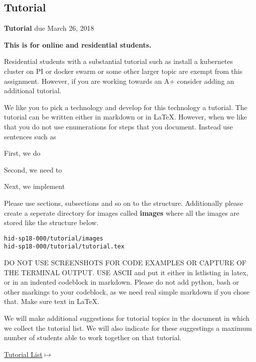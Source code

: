 \subsection{Tutorial}
\label{E:616-tutorial}

\begin{exercise} {\bf Tutorial} due March 26, 2018

{\bf This is for online and residential students.}

Residential students with a substantial tutorial such as install a
kubernetes cluster on PI or docker swarm or some other larger topic
are exempt from this assignment. However, if you are working towards
an A+ consider adding an additional tutorial.

 
We like you to pick a technology and develop for this technology a
tutorial. The tutorial can be written either in markdown or in
LaTeX. However, when we like that you do not use enumerations for
steps that you document. Instead use sentences such as
 
First, we do 
 
Second, we need to
 
Next, we implement
 
Please use sections, subsections and so on to the
structure. Additionally please create a seperate directory for images
called {\bf images} where all the images are stored like the structure
below. 

\begin{lstlisting}
hid-sp18-000/tutorial/images
hid-sp18-000/tutorial/tutorial.tex
\end{lstlisting}
 
DO NOT USE SCREENSHOTS FOR CODE EXAMPLES OR CAPTURE OF THE TERMINAL
OUTPUT.  USE ASCII and put it either in lstlisting in latex, or in an
indented codeblock in markdown. Please do not add python, bash or
other markings to your codeblock, as we need real simple markdown if
you chose that. Make sure text in LaTeX.

 
We will make additional suggestions for tutorial topics in the
document in which we collect the tutorial list. We will also indicate
for these suggestings a maximum number of students able to work
together on that tutorial.

{\hfill
  \href{https://docs.google.com/document/d/1L2-wYc7S7hb5u6ZNtKpTvlXqKMkqq-B38hlaBCw-eww/edit?usp=sharing}{Tutorial
    List$\mapsto$}}



\end{exercise} 



